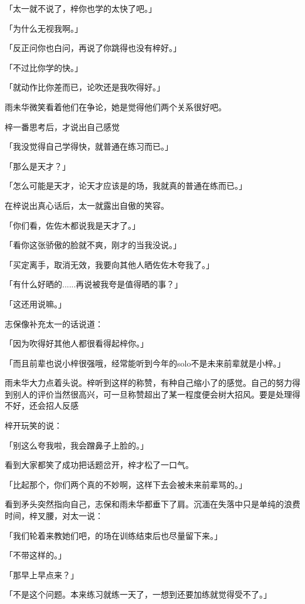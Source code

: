 \documentclass[UTF8]{ctexart}
\begin{document}
    「太一就不说了，梓你也学的太快了吧。」

    「为什么无视我啊。」

    「反正问你也白问，再说了你跳得也没有梓好。」

    「不过比你学的快。」

    「就动作比你差而已，论吹还是我吹得好。」

    雨未华微笑看着他们在争论，她是觉得他们两个关系很好吧。

    梓一番思考后，才说出自己感觉

    「我没觉得自己学得快，就普通在练习而已。」

    「那么是天才？」

    「怎么可能是天才，论天才应该是的场，我就真的普通在练而已。」

    在梓说出真心话后，太一就露出自傲的笑容。

    「你们看，佐佐木都说我是天才了。」

    「看你这张骄傲的脸就不爽，刚才的当我没说。」

    「买定离手，取消无效，我要向其他人晒佐佐木夸我了。」

    「有什么好晒的......再说被我夸是值得晒的事？」

    「这还用说嘛。」

    志保像补充太一的话说道：

    「因为吹得好其他人都很看得起梓你。」

    「而且前辈也说小梓很强哦，经常能听到今年的solo不是未来前辈就是小梓。」

    雨未华大力点着头说。梓听到这样的称赞，有种自己缩小了的感觉。自己的努力得到别人的评价当然很高兴，可一旦称赞超出了某一程度便会树大招风。要是处理得不好，还会招人反感

    梓开玩笑的说：

    「别这么夸我啦，我会蹭鼻子上脸的。」

    看到大家都笑了成功把话题岔开，梓才松了一口气。

    「比起那个，你们两个真的不妙啊，这样下去会被未来前辈骂的。」

    看到矛头突然指向自己，志保和雨未华都垂下了肩。沉湎在失落中只是单纯的浪费时间，梓叉腰，对太一说：

    「我们轮着来教她们吧，的场在训练结束后也尽量留下来。」

    「不带这样的。」

    「那早上早点来？」

    「不是这个问题。本来练习就练一天了，一想到还要加练就觉得受不了。」
\end{document}
